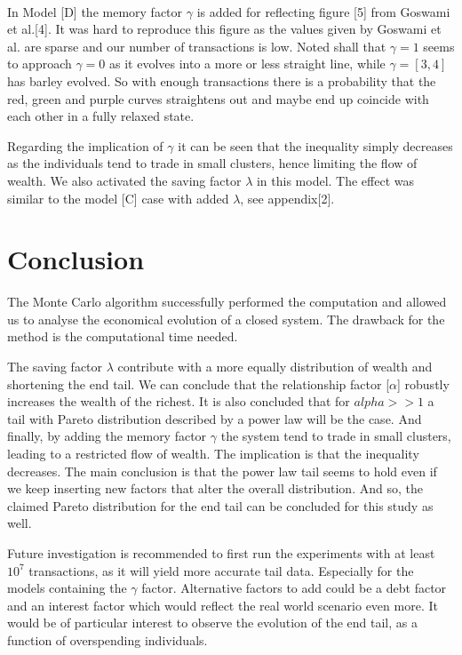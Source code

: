 \documentclass[a4paper,11pt]{article}
\begin{document}
\\
\par
In Model [D] the memory factor $\gamma$ is added for reflecting figure [5] from Goswami et al.[4]. It was hard to reproduce this figure as the values given by Goswami et al. are sparse and our number of transactions is low. Noted shall that $\gamma = 1$ seems to approach $\gamma = 0$ as it evolves into a more or less straight line, while $\gamma = [3,4]$ has barley evolved. So with enough transactions there is a probability that the red, green and purple curves straightens out and maybe end up coincide with each other in a fully relaxed state.
\\
\par
Regarding the implication of $\gamma$ it can be seen that the inequality simply decreases as the individuals tend to trade in small clusters, hence limiting the flow of wealth. We also activated the saving factor $\lambda$ in this model. The effect was similar to the model [C] case with added $\lambda$, see appendix[2]. 

\section{Conclusion}
The Monte Carlo algorithm successfully performed the computation and allowed us to analyse the economical evolution of a closed system. The drawback for the method is the computational time needed.
\\
\par
The saving factor $\lambda$ contribute with a more equally distribution of wealth and shortening the end tail. We can conclude that the relationship factor [$\alpha$] robustly increases the wealth of the richest. It is also concluded that for $alpha >> 1$ a tail with Pareto distribution described by a power law will be the case. And finally, by adding the memory factor $\gamma$ the system tend to trade in small clusters, leading to a restricted flow of wealth. The implication is that the inequality decreases. The main conclusion is that the power law tail seems to hold even if we keep inserting new factors that alter the overall distribution. And so, the claimed Pareto distribution for the end tail can be concluded for this study as well.
\\
\par
Future investigation is recommended to first run the experiments with at least $10^7$ transactions, as it will yield more accurate tail data. Especially for the models containing the $\gamma$ factor. Alternative factors to add could be a debt factor and an interest factor which would reflect the real world scenario even more. It would be of particular interest to observe the evolution of the end tail, as a function of overspending individuals.
\end{document}
